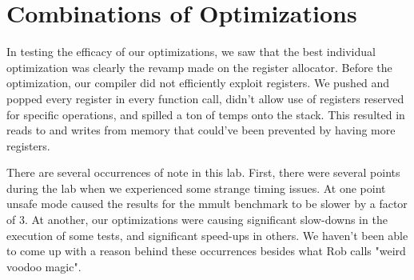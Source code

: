 \documentclass{article}
\begin{document}
\section{Combinations of Optimizations}

In testing the efficacy of our optimizations, we saw that the best individual optimization was clearly the revamp made on the register allocator. Before the optimization, our compiler did not efficiently exploit registers. We pushed and popped every register in every function call, didn't allow use of registers reserved for specific operations, and spilled a ton of temps onto the stack. This resulted in reads to and writes from memory that could've been prevented by having more registers.

There are several occurrences of note in this lab. First, there were several points during the lab when we experienced some strange timing issues. At one point unsafe mode caused the results for the mmult benchmark to be slower by a factor of 3. At another, our optimizations were causing significant slow-downs in the execution of some tests, and significant speed-ups in others. We haven't been able to come up with a reason behind these occurrences besides what Rob calls "weird voodoo magic".
\end{document}
